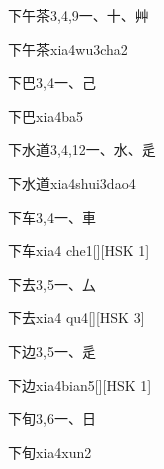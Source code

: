 \begin{entry}{下午茶}{3,4,9}{⼀、⼗、⾋}
  \begin{phonetics}{下午茶}{xia4wu3cha2}
  \end{phonetics}
\end{entry}

\begin{entry}{下巴}{3,4}{⼀、⼰}
  \begin{phonetics}{下巴}{xia4ba5}
  \end{phonetics}
\end{entry}

\begin{entry}{下水道}{3,4,12}{⼀、⽔、⾡}
  \begin{phonetics}{下水道}{xia4shui3dao4}
  \end{phonetics}
\end{entry}

\begin{entry}{下车}{3,4}{⼀、⾞}
  \begin{phonetics}{下车}{xia4 che1}[][HSK 1]
  \end{phonetics}
\end{entry}

\begin{entry}{下去}{3,5}{⼀、⼛}
  \begin{phonetics}{下去}{xia4 qu4}[][HSK 3]
  \end{phonetics}
\end{entry}

\begin{entry}{下边}{3,5}{⼀、⾡}
  \begin{phonetics}{下边}{xia4bian5}[][HSK 1]
  \end{phonetics}
\end{entry}

\begin{entry}{下旬}{3,6}{⼀、⽇}
  \begin{phonetics}{下旬}{xia4xun2}
  \end{phonetics}
\end{entry}

